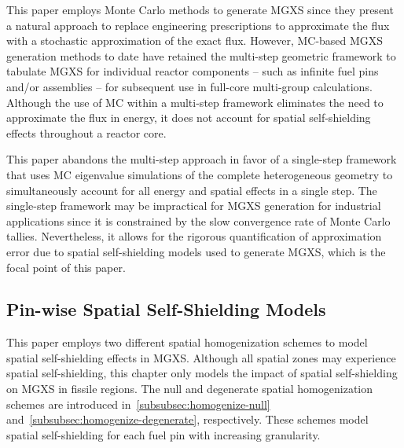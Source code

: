 This paper employs Monte Carlo methods to generate MGXS since they present a natural approach to replace engineering prescriptions to approximate the flux with a stochastic approximation of the exact flux. However, MC-based MGXS generation methods to date have retained the multi-step geometric framework to tabulate MGXS for individual reactor components -- such as infinite fuel pins and/or assemblies -- for subsequent use in full-core multi-group calculations. Although the use of MC within a multi-step framework eliminates the need to approximate the flux in energy, it does not account for spatial self-shielding effects throughout a reactor core. 

This paper abandons the multi-step approach in favor of a single-step framework that uses MC eigenvalue simulations of the complete heterogeneous geometry to simultaneously account for all energy and spatial effects in a single step. The single-step framework may be impractical for MGXS generation for industrial applications since it is constrained by the slow convergence rate of Monte Carlo tallies. Nevertheless, it allows for the rigorous quantification of approximation error due to spatial self-shielding models used to generate MGXS, which is the focal point of this paper.


\subsection{Pin-wise Spatial Self-Shielding Models}
\label{subsec:homogenize}


This paper employs two different spatial homogenization schemes to model spatial self-shielding effects in MGXS. Although all spatial zones may experience spatial self-shielding, this chapter only models the impact of spatial self-shielding on MGXS in fissile regions. The null and degenerate spatial homogenization schemes are introduced in~\autoref{subsubsec:homogenize-null} and~\autoref{subsubsec:homogenize-degenerate}, respectively. These schemes model spatial self-shielding for each fuel pin with increasing granularity. 


